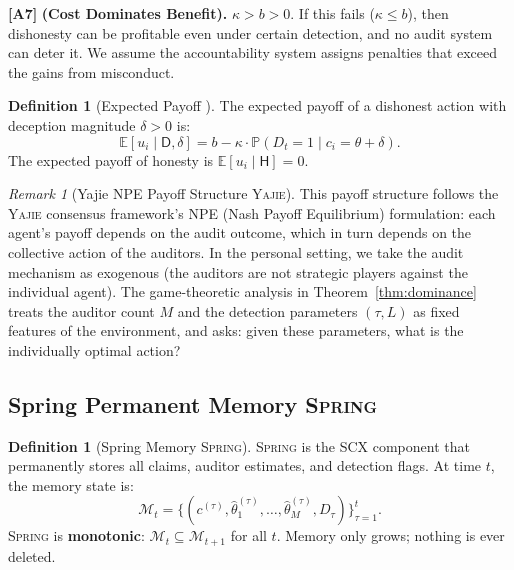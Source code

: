\documentclass[11pt,a4paper]{article}
\theoremstyle{definition}
\newtheorem{definition}[theorem]{Definition}
\theoremstyle{remark}
\newtheorem{remark}[theorem]{Remark}
\newcommand{\assumptionTag}[1]{\textsf{\textbf{[A#1]}}}
\newcommand{\SCX}{\textsc{SCX}}
\newcommand{\Yajie}{\textsc{Yajie}}
\newcommand{\Spring}{\textsc{Spring}}
\newcommand{\E}{\mathbb{E}}
\newcommand{\Pbb}{\mathbb{P}}
\newcommand{\cM}{\mathcal{M}}
\newcommand{\honest}{\mathsf{H}}
\newcommand{\dishonest}{\mathsf{D}}
\newcommand{\claim}{c}
\newcommand{\truth}{\theta}
\newcommand{\deception}{\delta}
\newcommand{\threshold}{\tau}
\newcommand{\tol}{L}
\newcommand{\benefit}{b}
\newcommand{\cost}{\kappa}
\begin{document}
\assumptionTag{7} \textbf{(Cost Dominates Benefit).} $\cost > \benefit > 0$. If this fails ($\cost \leq \benefit$), then dishonesty can be profitable even under certain detection, and no audit system can deter it. We assume the accountability system assigns penalties that exceed the gains from misconduct.

\begin{definition}[Expected Payoff ]
\label{def:expected}
The expected payoff of a dishonest action with deception magnitude $\deception > 0$ is:
\begin{equation}
    \E[u_i \mid \dishonest, \deception] = \benefit - \cost \cdot \Pbb(D_t = 1 \mid \claim_i = \truth + \deception).
\end{equation}
The expected payoff of honesty is $\E[u_i \mid \honest] = 0$.
\end{definition}

\begin{remark}[Yajie NPE Payoff Structure \Yajie{}]
\label{rem:yajie}
This payoff structure follows the \Yajie{} consensus framework's NPE (Nash Payoff Equilibrium) formulation: each agent's payoff depends on the audit outcome, which in turn depends on the collective action of the auditors. In the personal setting, we take the audit mechanism as exogenous (the auditors are not strategic players against the individual agent). The game-theoretic analysis in Theorem~\ref{thm:dominance} treats the auditor count $M$ and the detection parameters $(\threshold, \tol)$ as fixed features of the environment, and asks: given these parameters, what is the individually optimal action?
\end{remark}

\subsection{Spring Permanent Memory \Spring{}}

\begin{definition}[Spring Memory \Spring{}]
\label{def:spring}
\Spring{} is the \SCX{} component that permanently stores all claims, auditor estimates, and detection flags. At time $t$, the memory state is:
\begin{equation}
    \cM_t = \{(\claim^{(\tau)}, \hat{\theta}_1^{(\tau)}, \dots, \hat{\theta}_M^{(\tau)}, D_\tau)\}_{\tau=1}^{t}.
\end{equation}
\Spring{} is \textbf{monotonic}: $\cM_t \subseteq \cM_{t+1}$ for all $t$. Memory only grows; nothing is ever deleted.
\end{definition}
\end{document}
